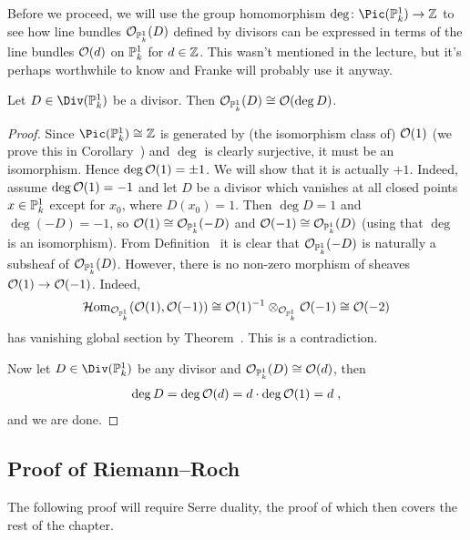 \documentclass[a4paper,parskip=half,numbers=enddot, DIV=12]{scrreprt}
\begin{document}
Before we proceed, we will use the group homomorphism $\deg\colon \Pic(\IP_k^1)\morphism\IZ$ to see how line bundles $\mathcal{O}_{\mathbb{P}_k^1}(D)$ defined by divisors can be expressed in terms of the line bundles $\mathcal{O}(d)$ on $\mathbb{P}_k^1$ for $d\in\mathbb{Z}$. This wasn't mentioned in the lecture, but it's perhaps worthwhile to know and Franke will probably use it anyway.
\begin{cor}
	Let $D\in\Div(\IP_k^1)$ be a divisor. Then $\mathcal{O}_{\mathbb{P}_k^1}(D)\cong \mathcal{O}(\deg D)$.
\end{cor}
\begin{proof}
	Since $\Pic(\IP_k^1)\cong \IZ$ is generated by (the isomorphism class of) $\mathcal{O}(1)$ (we prove this in Corollary~) and $\deg$ is clearly surjective, it must be an isomorphism. Hence $\deg \mathcal{O}(1)=\pm 1$. We will show that it is actually $+1$. Indeed, assume $\deg\mathcal{O}(1)=-1$ and let $D$ be a divisor which vanishes at all closed points $x\in \mathbb{P}_k^1$ except for $x_0$, where $D(x_0)=1$. Then $\deg D=1$ and $\deg (-D)=-1$, so $\mathcal{O}(1)\cong \mathcal{O}_{\mathbb{P}_k^1}(-D)$ and $\mathcal{O}(-1)\cong \mathcal{O}_{\mathbb{P}_k^1}(D)$ (using that $\deg$ is an isomorphism). From Definition~ it is clear that $\mathcal{O}_{\mathbb{P}_k^1}(-D)$ is naturally a subsheaf of $\mathcal{O}_{\mathbb{P}_k^1}(D)$. However, there is no non-zero morphism of sheaves $\Oo(1)\morphism\Oo(-1)$. Indeed, 
	\begin{align*}
	\operatorname{\mathcal{H} om}_{\mathcal{O}_{\mathbb{P}_k^1}}(\mathcal{O}(1),\mathcal{O}(-1))\cong \mathcal{O}(1)^{-1}\otimes_{\mathcal{O}_{\mathbb{P}_k^1}}\mathcal{O}(-1)\cong \mathcal{O}(-2)
	\end{align*}
	has vanishing global section by Theorem~. This is a contradiction.
	
	Now let $D\in\Div(\IP_k^1)$ be any divisor and $\mathcal{O}_{\mathbb{P}_k^1}(D)\cong\mathcal{O}(d)$, then
	\begin{align*}
	\deg D=\deg\mathcal{O}(d)=d\cdot \deg\mathcal{O}(1)=d\;,
	\end{align*}
	and we are done.
\end{proof}
\subsection{Proof of Riemann--Roch}
The following proof will require Serre duality, the proof of which then covers the rest of the chapter.
\end{document}
